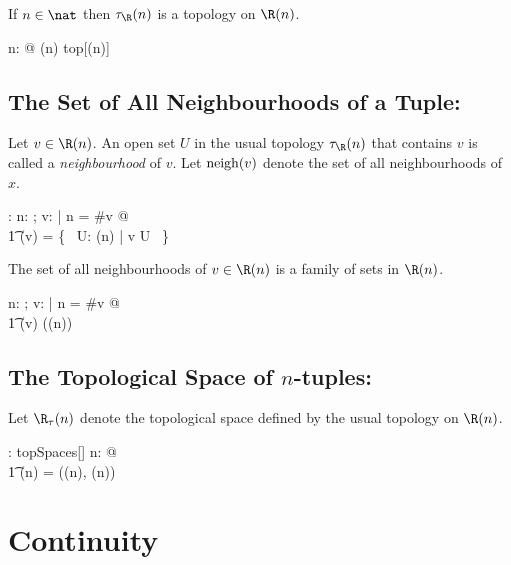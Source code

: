 \documentclass{amsart}
\begin{document}
\begin{remark}

If $n \in \nat$ then $\tauRtup(n)$ is a topology on $\Rtup(n)$.

\begin{zed}
	\forall n: \nat @ \tauRtup(n) \in top[\Rtup(n)]
\end{zed}
\end{remark}

\subsection{The Set of All Neighbourhoods of a Tuple: }

Let $v \in \Rtup(n)$. 
An open set $U$ in the usual topology $\tauRtup(n)$ that contains $v$
is called a \textit{neighbourhood} of $v$.
Let $\operatorname{neigh}(v)$ denote the set of all neighbourhoods of $x$.

\begin{axdef}
\neighRinf: \Rinf \fun \Fam \Rinf
\where
\forall n: \nat; v: \Rinf | n = \#v @ \\
\t1	\neighRinf(v) = \{~ U: \tauRtup(n) | v \in U ~\}
\end{axdef}

\begin{remark}

The set of all neighbourhoods of $v \in \Rtup(n)$ is a family of sets in $\Rtup(n)$.

\begin{zed}
\forall n: \nat; v: \Rinf | n = \#v @ \\
\t1	\neighRinf(v) \in \Fam (\Rtup(n))
\end{zed}

\end{remark}

\subsection{The Topological Space of $n$-tuples: }

Let $\tsRtup(n)$ denote the topological space defined by the usual topology on $\Rtup(n)$.

\begin{axdef}
	\tsRtup: \nat \fun topSpaces[\Rinf]
\where
	\forall n: \nat @ \\
	\t1	\tsRtup(n) = (\Rtup(n), \tauRtup(n))
\end{axdef}

\section{Continuity}
\end{document}
